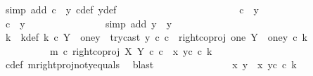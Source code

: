 \begin{isabellebody}
\ {\isacharparenleft}{\kern0pt}simp\ add{\isacharcolon}{\kern0pt}\ {\isacartoucheopen}c\ {\isacharequal}{\kern0pt}\ y{\isacartoucheclose}\ c{\isacharunderscore}{\kern0pt}def\ y{\isacharunderscore}{\kern0pt}def{\isacharparenright}{\kern0pt}\isanewline
\ \ \ \ \ \ \ \ \ \ \isamarkupfalse%
\isanewline
\ \ \ \ \ \ \ \ \ \ \ \ \isamarkupfalse%
\ {\isachardoublequoteopen}c\ {\isasymnoteq}\ y{\isachardoublequoteclose}\isanewline
\ \ \ \ \ \ \ \ \ \ \ \ \isamarkupfalse%
\ \isamarkupfalse%
\ {\isachardoublequoteopen}c\ {\isasymnoteq}\ y{}{\isachardoublequoteclose}\isanewline
\ \ \ \ \ \ \ \ \ \ \ \ \ \ \isamarkupfalse%
\ {\isacharparenleft}{\kern0pt}simp\ add{\isacharcolon}{\kern0pt}\ {\isacartoucheopen}y\ {\isacharequal}{\kern0pt}\ y{}{\isacartoucheclose}{\isacharparenright}{\kern0pt}\isanewline
\ \ \ \ \ \ \ \ \ \ \ \ \isamarkupfalse%
\ \isamarkupfalse%
\ k\ \ k{\isacharunderscore}{\kern0pt}def{\isacharcolon}{\kern0pt}\ {\isachardoublequoteopen}k\ {\isasymin}\isactrlsub c\ Y\ {\isasymsetminus}\ {\isacharparenleft}{\kern0pt}one{\isacharcomma}{\kern0pt}y{}{\isacharparenright}{\kern0pt}\ {\isasymand}\ try{\isacharunderscore}{\kern0pt}cast\ y{}\ {\isasymcirc}\isactrlsub c\ c\ {\isacharequal}{\kern0pt}\ right{\isacharunderscore}{\kern0pt}coproj\ one\ {\isacharparenleft}{\kern0pt}Y\ {\isasymsetminus}\ {\isacharparenleft}{\kern0pt}one{\isacharcomma}{\kern0pt}y{}{\isacharparenright}{\kern0pt}{\isacharparenright}{\kern0pt}\ {\isasymcirc}\isactrlsub c\ k\ {\isasymand}\ \isanewline
\ \ \ \ \ \ \ \ \ \ m\ {\isasymcirc}\isactrlsub c\ right{\isacharunderscore}{\kern0pt}coproj\ X\ Y\ {\isasymcirc}\isactrlsub c\ c\ {\isacharequal}{\kern0pt}\ {\isasymlangle}x{}{\isacharcomma}{\kern0pt}\ y{}\isactrlsup c\ {\isasymcirc}\isactrlsub c\ k{\isasymrangle}{\isachardoublequoteclose}\isanewline
\ \ \ \ \ \ \ \ \ \ \ \ \ \ \isamarkupfalse%
\ c{\isacharunderscore}{\kern0pt}def\ m{\isacharunderscore}{\kern0pt}rightproj{\isacharunderscore}{\kern0pt}not{\isacharunderscore}{\kern0pt}y{}{\isacharunderscore}{\kern0pt}equals\ \isamarkupfalse%
\ blast\isanewline
\ \ \ \ \ \ \ \ \ \ \ \ \isamarkupfalse%
\ \isamarkupfalse%
\ {\isachardoublequoteopen}{\isasymlangle}x{}{\isacharcomma}{\kern0pt}\ y{}{\isasymrangle}\ {\isacharequal}{\kern0pt}\ {\isasymlangle}x{}{\isacharcomma}{\kern0pt}\ y{}\isactrlsup c\ {\isasymcirc}\isactrlsub c\ k{\isasymrangle}{\isachardoublequoteclose}\isanewline

\end{isabellebody}
